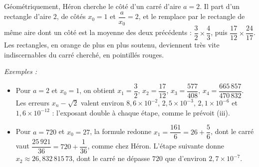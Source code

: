 \documentclass[a4paper,twoside]{report}
\newenvironment{exemples}%
 {\par\needspace{6\baselineskip}\vspace{1mm}\begin{list}{}{\leftmargin=1cm \rightmargin=0.5cm}\item[]%
  \textit{Exemples :}%
  \begin{itemize}[label=$\bullet$,leftmargin=0.45cm,topsep=3pt,itemsep=4pt]}%
 {\end{itemize}\end{list}\vspace{1mm}}
\begin{document}
\begin{center}
\end{center}

\noindent Géométriquement, Héron cherche le côté d'un carré d'aire $a = 2$. Il part d'un rectangle d'aire $2$, de côtés $x_{0} = 1$ et $\dfrac{a}{x_{0}} = 2$, et le remplace par le rectangle de même aire dont un côté est la moyenne des deux précédents : $\dfrac{3}{2} \times \dfrac{4}{3}$, puis $\dfrac{17}{12} \times \dfrac{24}{17}$. Les rectangles, en orange de plus en plus soutenu, deviennent très vite indiscernables du carré cherché, en pointillés rouges.

\begin{exemples}
  \item Pour $a = 2$ et $x_{0} = 1$, on obtient $x_{1} = \dfrac{3}{2}$, $x_{2} = \dfrac{17}{12}$, $x_{3} = \dfrac{577}{408}$, $x_{4} = \dfrac{665\,857}{470\,832}$. Les erreurs $x_{n} - \sqrt{2}$ valent environ $8{,}6 \times 10^{-2}$, $2{,}5 \times 10^{-3}$, $2{,}1 \times 10^{-6}$ et $1{,}6 \times 10^{-12}$ : l'exposant double à chaque étape, comme le prévoit (iii).
  \item Pour $a = 720$ et $x_{0} = 27$, la formule redonne $x_{1} = \dfrac{161}{6} = 26 + \dfrac{5}{6}$, dont le carré vaut $\dfrac{25\,921}{36} = 720 + \dfrac{1}{36}$, comme chez Héron. L'étape suivante donne $x_{2} \approx 26{,}832\,815\,73$, dont le carré ne dépasse $720$ que d'environ $2{,}7 \times 10^{-7}$.
\end{exemples}
\end{document}
